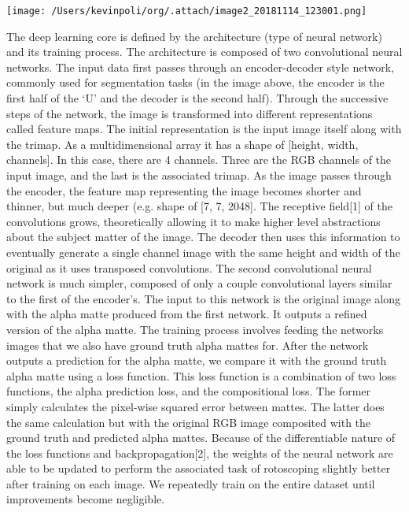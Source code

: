 \documentclass[15pt]{article}
\begin{document}
\begin{center}
\texttt{[image: /Users/kevinpoli/org/.attach/image2\_20181114\_123001.png]}
\end{center}
 The deep learning core is defined by the architecture (type of neural network) and its training process. The architecture is composed of two convolutional neural networks. The input data first passes through an encoder-decoder style network, commonly used for segmentation tasks (in the image above, the encoder is the first half of the ‘U’ and the decoder is the second half). Through the successive steps of the network, the image is transformed into different representations called feature maps. The initial representation is the input image itself along with the trimap. As a multidimensional array it has a shape of [height, width, channels]. In this case, there are 4 channels. Three are the RGB channels of the input image, and the last is the associated trimap. As the image passes through the encoder, the feature map representing the image becomes shorter and thinner, but much deeper (e.g. shape of [7, 7, 2048]. The receptive field[1] of the convolutions grows, theoretically allowing it to make higher level abstractions about the subject matter of the image. The decoder then uses this information to eventually generate a single channel image with the same height and width of the original as it uses transposed convolutions.
        The second convolutional neural network is much simpler, composed of only a couple convolutional layers similar to the first of the encoder’s. The input to this network is the original image along with the alpha matte produced from the first network. It outputs a refined version of the alpha matte.
        The training process involves feeding the networks images that we also have ground truth alpha mattes for. After the network outputs a prediction for the alpha matte, we compare it with the ground truth alpha matte using a loss function. This loss function is a combination of two loss functions, the alpha prediction loss, and the compositional loss. The former simply calculates the pixel-wise squared error between mattes. The latter does the same calculation but with the original RGB image composited with the ground truth and predicted alpha mattes. Because of the differentiable nature of the loss functions and backpropagation[2], the weights of the neural network are able to be updated to perform the associated task of rotoscoping slightly better after training on each image. We repeatedly train on the entire dataset until improvements become negligible.
\end{document}
